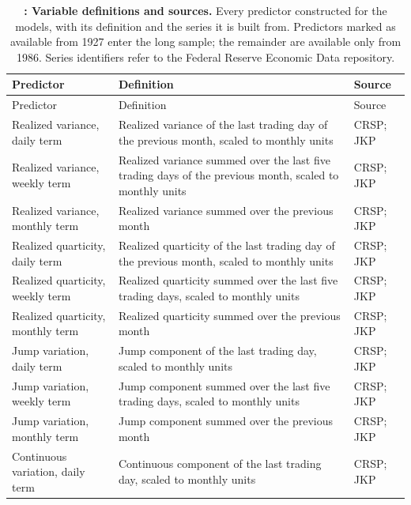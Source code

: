 {\footnotesize
\captionsetup{justification=raggedright,labelsep=none,singlelinecheck=false,labelformat=boldlabel}
\setlength{\tabcolsep}{3pt}
\renewcommand{\arraystretch}{1.1}
\setlength{\emergencystretch}{3em}
\begin{longtable}{>{\raggedright\arraybackslash}m{3.3cm}>{\raggedright\arraybackslash}m{6.2cm}>{\raggedright\arraybackslash}m{2.9cm}}
\caption[Variable definitions and sources]{\footnotesize \textbf{: Variable definitions and sources.} Every predictor constructed for the models, with its definition and the series it is built from. Predictors marked as available from 1927 enter the long sample; the remainder are available only from 1986. Series identifiers refer to the Federal Reserve Economic Data repository.} \label{tab:vardefs} \\
\hline
Predictor & Definition & Source \\
\hline
\endfirsthead
\hline
Predictor & Definition & Source \\
\hline
\endhead
\hline
\endfoot
Realized variance, daily term & Realized variance of the last trading day of the previous month, scaled to monthly units & CRSP; JKP \\
Realized variance, weekly term & Realized variance summed over the last five trading days of the previous month, scaled to monthly units & CRSP; JKP \\
Realized variance, monthly term & Realized variance summed over the previous month & CRSP; JKP \\
Realized quarticity, daily term & Realized quarticity of the last trading day of the previous month, scaled to monthly units & CRSP; JKP \\
Realized quarticity, weekly term & Realized quarticity summed over the last five trading days, scaled to monthly units & CRSP; JKP \\
Realized quarticity, monthly term & Realized quarticity summed over the previous month & CRSP; JKP \\
Jump variation, daily term & Jump component of the last trading day, scaled to monthly units & CRSP; JKP \\
Jump variation, weekly term & Jump component summed over the last five trading days, scaled to monthly units & CRSP; JKP \\
Jump variation, monthly term & Jump component summed over the previous month & CRSP; JKP \\
Continuous variation, daily term & Continuous component of the last trading day, scaled to monthly units & CRSP; JKP \\

\end{longtable}}
